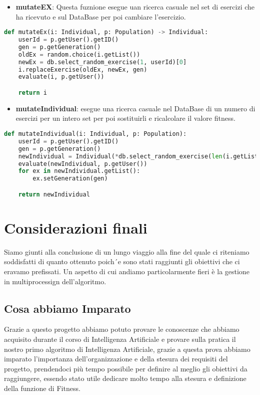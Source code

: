 \documentclass{article}
\begin{document}
\begin{itemize}
\item\textbf{mutateEX}: Questa fuznione esegue uan ricerca casuale nel set di esercizi che ha ricevuto e sul DataBase per poi cambiare l'esercizio.
\end{itemize}

\begin{lstlisting}[language=Python, breaklines, no caption]
def mutateEx(i: Individual, p: Population) -> Individual:
    userId = p.getUser().getID()
    gen = p.getGeneration()
    oldEx = random.choice(i.getList())
    newEx = db.select_random_exercise(1, userId)[0]
    i.replaceExercise(oldEx, newEx, gen)
    evaluate(i, p.getUser())

    return i
\end{lstlisting}

\begin{itemize}
\item\textbf{mutateIndividual}: esegue una ricerca casuale nel DataBase di un numero di esercizi per un intero set per poi sostituirli e ricalcolare il valore fitness.
\end{itemize}

\begin{lstlisting}[language=Python, breaklines, no caption]
def mutateIndividual(i: Individual, p: Population):
    userId = p.getUser().getID()
    gen = p.getGeneration()
    newIndividual = Individual(*db.select_random_exercise(len(i.getList()), userId))
    evaluate(newIndividual, p.getUser())
    for ex in newIndividual.getList():
        ex.setGeneration(gen)

    return newIndividual
\end{lstlisting}

\pagebreak

\section{Considerazioni finali}
Siamo giunti alla conclusione di un lungo viaggio alla fine del quale ci riteniamo soddisfatti di quanto ottenuto poich´e sono stati raggiunti gli obiettivi che ci eravamo prefissati. Un aspetto di cui andiamo particolarmente fieri è la gestione in multiprocessign dell'algoritmo.

\subsection{Cosa abbiamo Imparato}
Grazie a questo progetto abbiamo potuto provare le conoscenze che abbiamo acquisito durante il corso di Intelligenza Artificiale e provare sulla pratica il nostro primo algoritmo di Intelligenza Artificiale, grazie a questa prova abbiamo imparato l'importanza dell'organizzazione e della stesura dei requisiti del progetto, prendendoci più tempo possibile per definire al meglio gli obiettivi da raggiungere, essendo stato utile dedicare molto tempo alla stesura e definizione della funzione di Fitness.
\pagebreak
\end{document}
